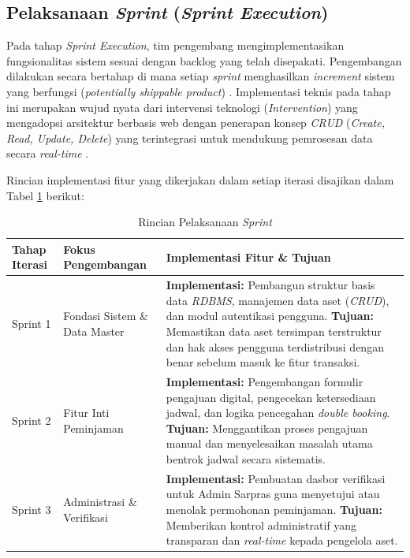 \subsection{Pelaksanaan \textit{Sprint} (\textit{Sprint Execution})}
Pada tahap \textit{Sprint Execution}, tim pengembang mengimplementasikan fungsionalitas sistem sesuai dengan backlog yang telah disepakati. Pengembangan dilakukan secara bertahap di mana setiap \textit{sprint} menghasilkan \textit{increment} sistem yang berfungsi (\textit{potentially shippable product}) \parencite{Schwaber2012}. Implementasi teknis pada tahap ini merupakan wujud nyata dari intervensi teknologi (\textit{Intervention}) yang mengadopsi arsitektur berbasis web dengan penerapan konsep \textit{CRUD} (\textit{Create, Read, Update, Delete}) yang terintegrasi untuk mendukung pemrosesan data secara \textit{real-time} \parencite{Pratama2025}.

Rincian implementasi fitur yang dikerjakan dalam setiap iterasi disajikan dalam Tabel \ref{tab:rincian_sprint_part1} berikut:

\begin{table}[htbp]
    \centering
    \normalsize
    \caption{Rincian Pelaksanaan \textit{Sprint}}
    \label{tab:rincian_sprint_part1}
    \begin{tabular}{|p{2cm}|p{4cm}|p{8cm}|}
        \hline
        \textbf{Tahap Iterasi} & \textbf{Fokus Pengembangan} & \textbf{Implementasi Fitur \& Tujuan} \\
        \hline
        Sprint 1 & Fondasi Sistem \& Data Master & \textbf{Implementasi:} Pembangun struktur basis data \textit{RDBMS}, manajemen data aset (\textit{CRUD}), dan modul autentikasi pengguna. \newline \textbf{Tujuan:} Memastikan data aset tersimpan terstruktur dan hak akses pengguna terdistribusi dengan benar sebelum masuk ke fitur transaksi. \\
        \hline
        Sprint 2 & Fitur Inti Peminjaman & \textbf{Implementasi:} Pengembangan formulir pengajuan digital, pengecekan ketersediaan jadwal, dan logika pencegahan \textit{\textit{double booking}}. \newline \textbf{Tujuan:} Menggantikan proses pengajuan manual dan menyelesaikan masalah utama bentrok jadwal secara sistematis. \\
        \hline
        Sprint 3 & Administrasi \& Verifikasi & \textbf{Implementasi:} Pembuatan dasbor verifikasi untuk Admin Sarpras guna menyetujui atau menolak permohonan peminjaman. \newline \textbf{Tujuan:} Memberikan kontrol administratif yang transparan dan \textit{\textit{real-time}} kepada pengelola aset. \\
        \hline
    \end{tabular}
\end{table}

